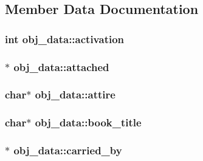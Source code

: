 \subsection{Member Data Documentation}
\hypertarget{structobj__data_a2c61309f316be645ac769b4a2c82c13d}{
\subsubsection[{activation}]{\setlength{\rightskip}{0pt plus 5cm}int obj\-\_\-data\-::activation}}\label{structobj__data_a2c61309f316be645ac769b4a2c82c13d}
\hypertarget{structobj__data_a834d9cc008c50fd20403d445369ed468}{
\subsubsection[{attached}]{$\ast$ obj\-\_\-data\-::attached}}\label{structobj__data_a834d9cc008c50fd20403d445369ed468}
\hypertarget{structobj__data_afeec748d15675c4fd3c4e03ed7061b5f}{
\subsubsection[{attire}]{\setlength{\rightskip}{0pt plus 5cm}char$\ast$ obj\-\_\-data\-::attire}}\label{structobj__data_afeec748d15675c4fd3c4e03ed7061b5f}
\hypertarget{structobj__data_a4e5beb47c4a93b6ba2dfb9c3c3e861ca}{
\subsubsection[{book\-\_\-title}]{\setlength{\rightskip}{0pt plus 5cm}char$\ast$ obj\-\_\-data\-::book\-\_\-title}}\label{structobj__data_a4e5beb47c4a93b6ba2dfb9c3c3e861ca}
\hypertarget{structobj__data_a0388d60f29d6a628dbad79bf22b649f0}{
\subsubsection[{carried\-\_\-by}]{$\ast$ obj\-\_\-data\-::carried\-\_\-by}}\label{structobj__data_a0388d60f29d6a628dbad79bf22b649f0}
